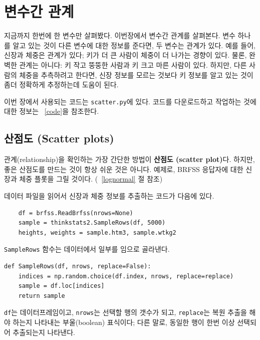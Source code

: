 

\chapter{변수간 관계}

지금까지 한번에 한 변수만 살펴봤다.
이번장에서 변수간 관계를 살펴본다.
변수 하나를 알고 있는 것이 다른 변수에 대한 정보를 준다면, 두 변수는 관계가 있다.
예를 들어, 신장과 체중은 관계가 있다; 키가 더 큰 사람이 체중이 더 나가는 경향이 있다.
물론, 완벽한 관계는 아니다: 키 작고 뚱뚱한 사람과 키 크고 마른 사람이 있다.
하지만, 다른 사람의 체중을 추측하려고 한다면, 신장 정보를 모르는 것보다 키 정보를 알고 있는 것이
좀더 정확하게 추정하는데 도움이 된다.



이번 장에서 사용되는 코드는 {\tt scatter.py}에 있다.
코드를 다운로드하고 작업하는 것에 대한 정보는 ~\ref{code}을 참조한다.

\section{산점도 (Scatter plots)}

관계(relationship)을 확인하는 가장 간단한 방법이 {\bf 산점도 (scatter plot)}다.
하지만, 좋은 산점도를 만드는 것이 항상 쉬운 것은 아니다.
예제로, BRFSS 응답자에 대한 신장과 체중 플롯을 그릴 것이다. (~\ref{lognormal} 절 참조)

데이터 파일을 읽어서 신장과 체중 정보를 추출하는 코드가 다음에 있다.

\begin{verbatim}
    df = brfss.ReadBrfss(nrows=None)
    sample = thinkstats2.SampleRows(df, 5000)
    heights, weights = sample.htm3, sample.wtkg2
\end{verbatim}

{\tt SampleRows} 함수는 데이터에서 일부를 임으로 골라낸다. 

\begin{verbatim}
def SampleRows(df, nrows, replace=False):
    indices = np.random.choice(df.index, nrows, replace=replace)
    sample = df.loc[indices]
    return sample
\end{verbatim}

{\tt df}는 데이터프레임이고, {\tt nrows}는 선택할 행의 갯수가 되고, 
{\tt replace}는 복원 추출을 해야 하는지 나타내는 부울(boolean) 표식이다; 
다른 말로, 동일한 행이 한번 이상 선택되어 추출되는지 나타낸다. 

